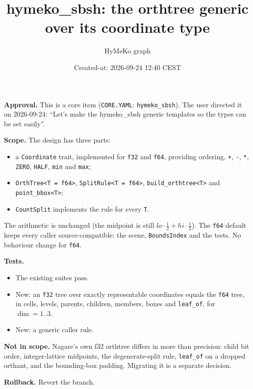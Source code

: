 \documentclass[10pt,a4paper]{article}
\title{hymeko\_sbsh: the orthtree generic over its coordinate type}\author{HyMeKo graph}
\date{Created-at: 2026-09-24 12:40 CEST}
\begin{document}
\maketitle
\textbf{Approval.} This is a core item (\texttt{CORE.YAML}: \texttt{hymeko\_sbsh}). The user directed
it on 2026-09-24: ``Let's make the hymeko\_sbsh generic templates so the types can be set
easily''.

\textbf{Scope.} The design has three parts:
\begin{itemize}
\item a \texttt{Coordinate} trait, implemented for \texttt{f32} and \texttt{f64}, providing
  ordering, \texttt{+}, \texttt{-}, \texttt{*}, \texttt{ZERO}, \texttt{HALF}, \texttt{min} and
  \texttt{max};
\item \texttt{OrthTree<T = f64>}, \texttt{SplitRule<T = f64>}, \texttt{build\_orthtree<T>} and
  \texttt{point\_bbox<T>};
\item \texttt{CountSplit} implements the rule for every \texttt{T}.
\end{itemize}
The arithmetic is unchanged (the midpoint is still $lo\cdot\frac12+hi\cdot\frac12$). The
\texttt{f64} default keeps every caller source-compatible: the scene, \texttt{BoundsIndex} and the
tests. No behaviour change for \texttt{f64}.

\textbf{Tests.}
\begin{itemize}
\item The existing suites pass.
\item New: an \texttt{f32} tree over exactly representable coordinates equals the \texttt{f64}
  tree, in cells, levels, parents, children, members, boxes and \texttt{leaf\_of}, for
  $\dim = 1..3$.
\item New: a generic caller rule.
\end{itemize}

\textbf{Not in scope.} Nagare's own f32 orthtree differs in more than precision: child bit order,
integer-lattice midpoints, the degenerate-split rule, \texttt{leaf\_of} on a dropped orthant, and
the bounding-box padding. Migrating it is a separate decision.

\textbf{Rollback.} Revert the branch.
\begin{center}\end{center}
\end{document}
